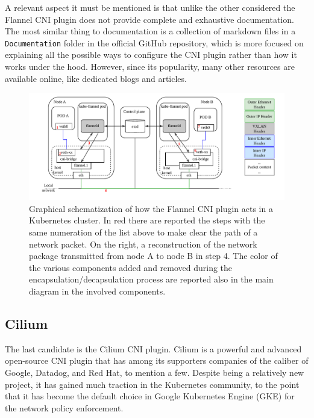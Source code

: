 A relevant aspect it must be mentioned is that unlike the other considered the
Flannel CNI plugin does not provide complete and exhaustive documentation. The
most similar thing to documentation is a collection of markdown files in a
\texttt{Documentation} folder in the official GitHub repository, which is more
focused on explaining all the possible ways to configure the CNI plugin rather
than how it works under the hood. However, since its popularity, many other
resources are available online, like dedicated blogs and articles.


\begin{figure}
  \centering
  \includegraphics[width=\textwidth]{img/chpt2/CNI-flannel}
  \caption{Graphical schematization of how the Flannel CNI plugin acts in a
    Kubernetes cluster. In red there are reported the steps with the same
    numeration of the list above to make clear the path of a network packet.
    On the right, a reconstruction of the network package transmitted from node
    A to node B in step 4. The color of the various components added and removed
    during the encapsulation/decapsulation process are reported also in the main
    diagram in the involved components.
  }
  \label{fig:cni-flannel}
\end{figure}

\subsection{Cilium}\label{subsec:cilium}

The last candidate is the Cilium CNI plugin. Cilium is a powerful and advanced
open-source CNI plugin that has among its supporters companies of the caliber of
Google, Datadog, and Red Hat, to mention a few.
Despite being a relatively new project, it has gained much traction in the
Kubernetes community, to the point that it has become the default choice in
Google Kubernetes Engine (GKE) for the network policy enforcement.

